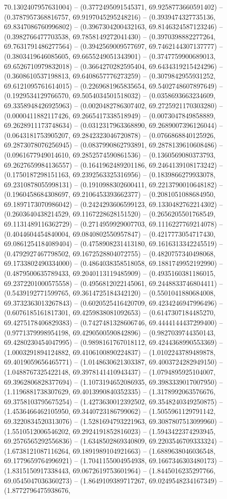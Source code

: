 70.1302407957631004) -- (0.3772495091545371, 69.9258773660591402) -- (0.3787957368816757, 69.9197045295248216) -- (0.3939474327735136, 69.8347086760996802) -- (0.3967304200432163, 69.8146324587123246) -- (0.3982766477703538, 69.7858149272041430) -- (0.3970398882277264, 69.7631791486277564) -- (0.3942569009577697, 69.7462144307137777) -- (0.3803419646085605, 69.6655249051343901) -- (0.3747759900689013, 69.6526710979832018) -- (0.3664270282595404, 69.6434319215424296) -- (0.3608610537198813, 69.6408657776273259) -- (0.3079842955931252, 69.6121095761614015) -- (0.2269681965835654, 69.5402748607897649) -- (0.1929534129766570, 69.5054034501518032) -- (0.0358693663234609, 69.3358948426925963) -- (0.0020482786307402, 69.2725921170303280) -- (0.0000411882117426, 69.2665417338518949) -- (0.0073047849858889, 69.2628911173748634) -- (0.0312317963368890, 69.2689007396126044) -- (0.0643181753905207, 69.2842323046720878) -- (0.0766868840125926, 69.2873078076256945) -- (0.0837990862793891, 69.2878139610608486) -- (0.0961677949014610, 69.2852574590861536) -- (0.1360569080373793, 69.2627659984136557) -- (0.1641962489201186, 69.2464139108173242) -- (0.1750187298151163, 69.2392563325316956) -- (0.1839866279933078, 69.2310878055998131) -- (0.1910988302600411, 69.2213790010648182) -- (0.1960458684308697, 69.2106453393662377) -- (0.2081051088684950, 69.1897173070986042) -- (0.2424293606599123, 69.1330482762214302) -- (0.2603640438214529, 69.1167228628151520) -- (0.2656205501768549, 69.1131489116362729) -- (0.2714959929007703, 69.1116227769214078) -- (0.4044604454840004, 69.0840802550957847) -- (0.4217773054717430, 69.0861254184089404) -- (0.4758908231413180, 69.1616313342245519) -- (0.4792927467798502, 69.1672528804072755) -- (0.4820757340498068, 69.1733802490334000) -- (0.4864038358518058, 69.1881749952192990) -- (0.4879500635789433, 69.2040113119485909) -- (0.4935160381186015, 69.2372201000575558) -- (0.4956812022145061, 69.2448833746804411) -- (0.5439192771599765, 69.3614725184342120) -- (0.5501041880684008, 69.3732363013267843) -- (0.6020525416420709, 69.4234246947996496) -- (0.6076185161817301, 69.4259838081092653) -- (0.6147307184485270, 69.4275178406829383) -- (0.7427481328606746, 69.4444144437299400) -- (0.9771379998954198, 69.4290500590842896) -- (0.9827039744350143, 69.4280230454047995) -- (0.9898161767018112, 69.4244368990553369) -- (1.0003291894124882, 69.4106100890224837) -- (1.0102243789489878, 69.4019059656465771) -- (1.0148630621303387, 69.4003724282949150) -- (1.0488767325422148, 69.3978141410943437) -- (1.0794895925104007, 69.3962806828377694) -- (1.1073194652086935, 69.3983339017007950) -- (1.1196881738307629, 69.4013990840352335) -- (1.3178992063576676, 69.3758103795675254) -- (1.4273630012392502, 69.3548240349250875) -- (1.4536466462105950, 69.3440723186799062) -- (1.5055961129791142, 69.3220834520313076) -- (1.5281694793221963, 69.3087807513099960) -- (1.5510512006546202, 69.2924191852816023) -- (1.5943422374293945, 69.2576565292556836) -- (1.6348502869340809, 69.2203546709333324) -- (1.6738121087116264, 69.1891989104921663) -- (1.6889638046036548, 69.1779659764996921) -- (1.7041155004954938, 69.1667346303480173) -- (1.8315150917338443, 69.0672619753601964) -- (1.8445016235297766, 69.0545047036360273) -- (1.8649109389717267, 69.0249548234167349) -- (1.8772796475938676, 